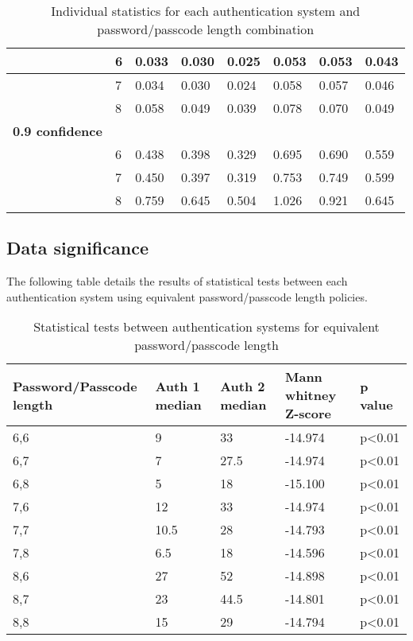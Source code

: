 \documentclass[british,10pt,a4paper]{article}
\begin{document}
\begin{appendices}
\begin{table}[]
\begin{tabular}{|l|l|l|l|l|l|l|l|}
		 & 6 & 0.033 & 0.030 & 0.025 & 0.053 & 0.053 & 0.043 \\ \hline
		 & 7 & 0.034 & 0.030 & 0.024 & 0.058 & 0.057 & 0.046 \\ \hline
		 & 8 & 0.058 & 0.049 & 0.039 & 0.078 & 0.070 & 0.049 \\ \hline
		\textbf{0.9 confidence} &  &  &  &  &  &  &  \\ \hline
		 & 6 & 0.438 & 0.398 & 0.329 & 0.695 & 0.690 & 0.559 \\ \hline
		 & 7 & 0.450 & 0.397 & 0.319 & 0.753 & 0.749 & 0.599 \\ \hline
		 & 8 & 0.759 & 0.645 & 0.504 & 1.026 & 0.921 & 0.645 \\ \hline
		\end{tabular}
		\caption{Individual statistics for each authentication system and password/passcode length combination}
	\end{table}
  	\clearpage

  	\subsection{Data significance}
  	\label{app:significant_stats}
  	The following table details the results of statistical tests between each authentication system using equivalent password/passcode length policies.
  	\begin{table}[h]
	\centering
	\begin{tabular}{|l|l|l|l|l|}
	\hline
	Password/Passcode length & Auth 1 median & Auth 2 median & Mann whitney Z-score & p value \\ \hline
	6,6 & 9 & 33 & -14.974 & p\textless0.01 \\ \hline
	6,7 & 7 & 27.5 & -14.974 & p\textless0.01 \\ \hline
	6,8 & 5 & 18 & -15.100 & p\textless0.01 \\ \hline
	7,6 & 12 & 33 & -14.974 & p\textless0.01 \\ \hline
	7,7 & 10.5 & 28 & -14.793 & p\textless0.01 \\ \hline
	7,8 & 6.5 & 18 & -14.596 & p\textless0.01 \\ \hline
	8,6 & 27 & 52 & -14.898 & p\textless0.01 \\ \hline
	8,7 & 23 & 44.5 & -14.801 & p\textless0.01 \\ \hline
	8,8 & 15 & 29 & -14.794 & p\textless0.01 \\ \hline
	\end{tabular}
	\caption{Statistical tests between authentication systems for equivalent password/passcode length}
	\label{tab:significance}
	\end{table}
\end{appendices}
\clearpage
\end{document}
